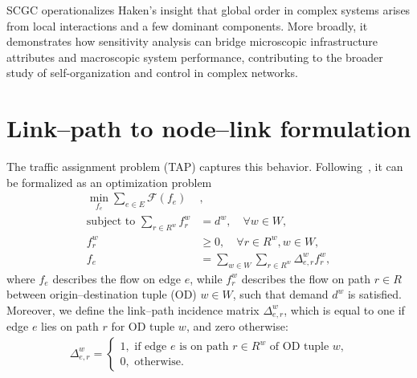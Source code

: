 \documentclass[twocolumn,english,groupedaddress, superscriptaddress,aps,pre,10pt,floatfix]{revtex4-2}
\begin{document}
SCGC operationalizes Haken's insight that global order in complex systems arises from local interactions and a few dominant components. More broadly, it demonstrates how sensitivity analysis can bridge microscopic infrastructure attributes and macroscopic system performance, contributing to the broader study of self-organization and control in complex networks.


\newpage
\appendix
\section{Link--path to node--link formulation}\label{app:link-path-node}
The traffic assignment problem (TAP) captures this behavior. Following~\citep{beckmann1956studies, dafermos1969traffic, dafermos1980traffic}, it can be formalized as an optimization problem
\begin{align}\label{eq:app-tap-link-path}
    \min_{{f_e}} \sum_{e \in E} \mathcal{F}(f_e) &, \nonumber \\
   \text{subject to } \sum_{r\in R^w} f_r^w &= d^w, \quad \forall w\in W, \nonumber \\
    f_r^w &\geq 0, \quad \forall r \in R^w, w \in W, \nonumber \\
    f_e &= \sum_{w\in W}\sum_{r\in R^w}\Delta_{e,r}^w f_r^w, 
\end{align}
where $f_e$ describes the flow on edge $e$, while $f_r^w$ describes the flow on path $r \in R$ between origin--destination tuple (OD) $w \in W$, such that demand $d^w$ is satisfied. Moreover, we define the link--path incidence matrix $\Delta^w_{e,r}$, which is equal to one if edge $e$ lies on path $r$ for OD tuple $w$, and zero otherwise:
\begin{align}
\Delta^w_{e,r} = 
    \begin{cases}
        1, \text{ if edge $e$ is on path $r \in R^w$ of OD tuple $w$,}\\
        0, \text{ otherwise.}
    \end{cases}
\end{align}
\end{document}
